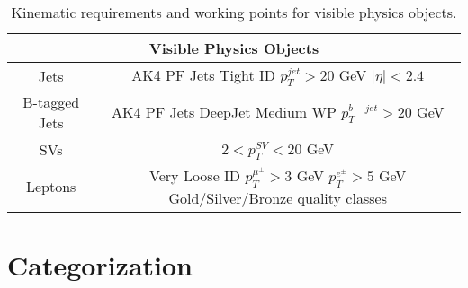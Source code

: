 \begin{table}
\centering
\caption{Kinematic requirements and working points for visible physics objects.}
\begin{tabular}{c|c}
\hline 
\multicolumn{2}{c}{Visible Physics Objects} \\ 
\hline 
\hline
Jets & \makecell{AK4 PF Jets \\ Tight ID \\ $p_T^{jet} > 20$ GeV \\ $|\eta| <2.4$} \\ 
\hline
B-tagged Jets & \makecell{AK4 PF Jets \\ DeepJet Medium WP \\ $p_T^{b-jet} > 20 $ GeV}  \\ 
\hline
SVs & $2<p_T^{SV}<20$ GeV \\ 
\hline
Leptons & \makecell{Very Loose ID \\ $p_T^{\mu^\pm} > 3$ GeV \\ $p_T^{e^\pm} > 5 $ GeV \\ Gold/Silver/Bronze quality classes} \\ 
\hline 
\end{tabular} 
\label{tab:physicsobjects}
\end{table}

\section{Categorization}

